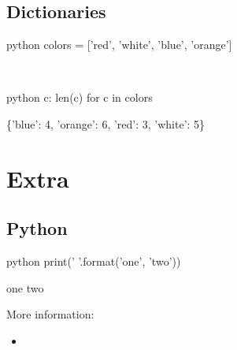 \documentclass[aspectratio=1610,t]{beamer}
\begin{document}
\subsection{Dictionaries}
\begin{pframe}
 \begin{ipython}
  \begin{pythonin}{python}
colors = ['red', 'white', 'blue', 'orange']
  \end{pythonin}
  \\
  \begin{pythonin}{python}
{c: len(c) for c in colors}
  \end{pythonin}
  \begin{pythonout}
\{'blue': 4, 'orange': 6, 'red': 3, 'white': 5\}
  \end{pythonout}
 \end{ipython}
\end{pframe}



\section*{Extra}

\subsection{Python }
\begin{pframe}
 \begin{ipython}
  \begin{pythonin}{python}
print('{} {}'.format('one', 'two'))
  \end{pythonin}
  \begin{pythonout}
one two
  \end{pythonout}
 \end{ipython}
 \bigskip

 More information:
 \begin{itemize}
  \item {}
 \end{itemize}
\end{pframe}
\end{document}
